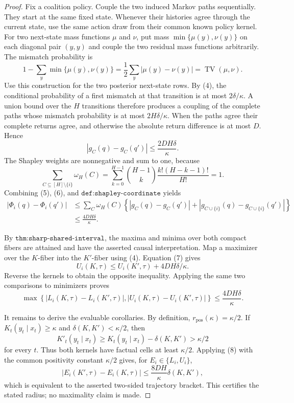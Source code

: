 \documentclass{article}
\begin{document}
\begin{proof}
Fix a coalition policy.  Couple the two induced Markov paths sequentially.  They start at the same fixed state.  Whenever their histories agree through the current state, use the same action draw from their common known policy kernel.  For two next-state mass functions \(\mu\) and \(\nu\), put mass \(\min\{\mu(y),\nu(y)\}\) on each diagonal pair \((y,y)\) and couple the two residual mass functions arbitrarily.  The mismatch probability is
\[
 1-\sum_y\min\{\mu(y),\nu(y)\}
 =\frac12\sum_y|\mu(y)-\nu(y)|
 =\operatorname{TV}(\mu,\nu).
\]
Use this construction for the two posterior next-state rows.  By (4), the conditional probability of a first mismatch at that transition is at most \(2\delta/\kappa\).  A union bound over the \(H\) transitions therefore produces a coupling of the complete paths whose mismatch probability is at most \(2H\delta/\kappa\).  When the paths agree their complete returns agree, and otherwise the absolute return difference is at most \(D\).  Hence
\[
 |g_C(q)-g_C(q')|\le\frac{2DH\delta}{\kappa}.
 \tag{5}
\]
The Shapley weights are nonnegative and sum to one, because
\[
 \sum_{C\subseteq[H]\setminus\{i\}}\omega_H(C)
 =\sum_{k=0}^{H-1}{H-1\choose k}
   \frac{k!(H-k-1)!}{H!}
 =1.
 \tag{6}
\]
Combining (5), (6), and \(\texttt{def:shapley-coordinate}\) yields
\[
\begin{aligned}
 |\Phi_i(q)-\Phi_i(q')|
 &\le\sum_C\omega_H(C)
 \left\{|g_C(q)-g_C(q')|
       +|g_{C\cup\{i\}}(q)-g_{C\cup\{i\}}(q')|\right\}\\
 &\le\frac{4DH\delta}{\kappa}.
\end{aligned}
\tag{7}
\]

By \(\texttt{thm:sharp-shared-interval}\), the maxima and minima over both compact fibers are attained and have the asserted causal interpretation.  Map a maximizer over the \(K\)-fiber into the \(K'\)-fiber using (4).  Equation (7) gives
\[
 U_i(K,\tau)\le U_i(K',\tau)+4DH\delta/\kappa.
\]
Reverse the kernels to obtain the opposite inequality.  Applying the same two comparisons to minimizers proves
\[
 \max\!\left\{|L_i(K,\tau)-L_i(K',\tau)|,
                 |U_i(K,\tau)-U_i(K',\tau)|\right\}
 \le\frac{4DH\delta}{\kappa}.
 \tag{8}
\]

It remains to derive the evaluable corollaries.  By definition, \(r_{\mathrm{pos}}(\kappa)=\kappa/2\).  If \(K_t(y_t\mid x_t)\ge\kappa\) and \(\delta(K,K')<\kappa/2\), then
\[
 K'_t(y_t\mid x_t)
 \ge K_t(y_t\mid x_t)-\delta(K,K')
 >\kappa/2
\]
for every \(t\).  Thus both kernels have factual cells at least \(\kappa/2\).  Applying (8) with the common positivity constant \(\kappa/2\) gives, for \(E_i\in\{L_i,U_i\}\),
\[
 |E_i(K',\tau)-E_i(K,\tau)|
 \le\frac{8DH}{\kappa}\delta(K,K'),
\]
which is equivalent to the asserted two-sided trajectory bracket.  This certifies the stated radius; no maximality claim is made.


\end{proof}
\end{document}
